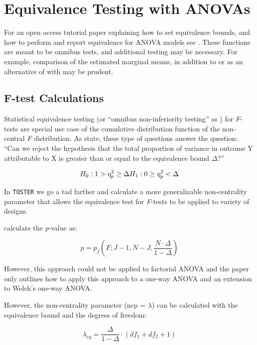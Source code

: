 \documentclass[]{interact}
\theoremstyle{plain}%
\theoremstyle{definition}
\theoremstyle{remark}
\begin{document}
\hypertarget{equivalence-testing-with-anovas}{%
\section{Equivalence Testing with
ANOVAs}\label{equivalence-testing-with-anovas}}

For an open access tutorial paper explaining how to set equivalence
bounds, and how to perform and report equivalence for ANOVA models see
\citet{Campbell_2021}. These functions are meant to be omnibus tests,
and additional testing may be necessary. For example, comparison of the
estimated marginal means, in addition to or as an alternative of with
may be prudent.

\hypertarget{f-test-calculations}{%
\subsection{F-test Calculations}\label{f-test-calculations}}

Statistical equivalence testing (or ``omnibus non-inferiority testing''
as \citet{Campbell_2021}) for \emph{F}-tests are special use case of the
cumulative distribution function of the non-central \emph{F}
distribution. As \citet{Campbell_2021} state, these type of questions
answer the question: ``Can we reject the hypothesis that the total
proportion of variance in outcome Y attributable to X is greater than or
equal to the equivalence bound \(\Delta\)?''

\[
H_0: \space 1 > \eta^2_p \geq \Delta
\\
H_1: \space 0 \geq \eta^2_p < \Delta
\]

In \texttt{TOSTER} we go a tad farther and calculate a more
generalizable non-centrality parameter that allows the equivalence test
for \emph{F}-tests to be applied to variety of designs.

\citet{Campbell_2021} calculate the \emph{p}-value as:

\[
p = p_f(F; J-1, N-J, \frac{N \cdot \Delta}{1-\Delta})
\]

However, this approach could not be applied to factorial ANOVA and the
paper only outlines how to apply this approach to a one-way ANOVA and an
extension to Welch's one-way ANOVA.

However, the non-centrality parameter (ncp = \(\lambda\)) can be
calculated with the equivalence bound and the degrees of freedom:

\[
\lambda_{eq} = \frac{\Delta}{1-\Delta} \cdot(df_1 + df_2 +1)
\]
\end{document}

